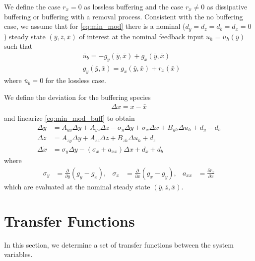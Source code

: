 \documentclass[letterpaper, 10 pt,  conference]{ieeeconf}  %
\begin{document}
We define the case $r_x=0$ as lossless buffering and the case $r_x\ne 0$ as dissipative buffering or buffering with a removal process. Consistent with the no buffering case, we assume that for \eqref{eq:min_mod} there is a nominal ($d_y=d_z=d_b=d_x=0$) steady state $(\bar{y},\bar{z},\bar{x})$ of interest at the nominal feedback input $u_h=\bar{u}_h(\bar{y})$ such that
\begin{equation*}
\begin{aligned}
&\bar{u}_b=-g_y(\bar y,\bar x)+g_x(\bar y,\bar x)\\
&g_y(\bar y,\bar x)=g_x(\bar y,\bar x)+r_x(\bar x)
\end{aligned}
\end{equation*}
where $\bar{u}_b=0$ for the lossless case.

We define the deviation for the buffering species
\begin{equation*}
\begin{aligned}
	\Delta x =x-\bar x\\
\end{aligned}
\end{equation*}
and linearize \eqref{eq:min_mod_buff} to obtain
\begin{equation}\label{eq:min_mod_lin}
\begin{aligned}
\Delta\dot{y}&=A_{yy}\Delta y+A_{yz}\Delta z-\sigma_y \Delta y +\sigma_x\Delta x+B_{yh}\Delta u_h+d_y-d_b\\
\Delta\dot{z}&=A_{zy}\Delta y+A_{zz}\Delta z+B_{zh}\Delta u_h+d_z\\
\Delta\dot{x}&=\sigma_y \Delta y -(\sigma_x+a_{xx} )\Delta x+d_x+d_b
\end{aligned}
\end{equation}
where 
\begin{equation*}
\begin{aligned}
\sigma_y&=\frac{\partial }{\partial y}(g_y-g_x),&\sigma_x&=\frac{\partial }{\partial x}(g_x-g_y),&a_{xx}&=\frac{\partial r_x}{\partial x}
\end{aligned}
\end{equation*}
which are evaluated at the nominal steady state $(\bar{y},\bar{z},\bar{x})$. 

\section{Transfer Functions}\label{sect:tf}

In this section, we determine a set of transfer functions between the system variables. 
\end{document}
